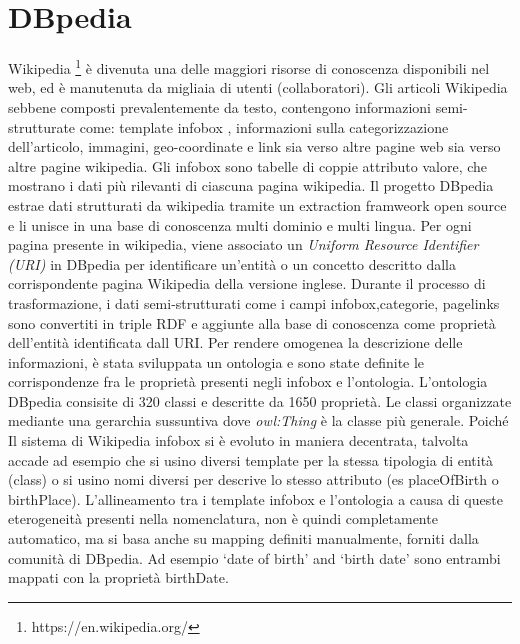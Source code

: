 \section{DBpedia}
Wikipedia \footnote{https://en.wikipedia.org/} è divenuta una delle maggiori risorse di conoscenza disponibili nel web, ed è manutenuta da migliaia di utenti (collaboratori). Gli articoli Wikipedia sebbene composti prevalentemente da testo, contengono informazioni semi-strutturate come: template infobox , informazioni sulla categorizzazione dell'articolo, immagini, geo-coordinate e link sia verso altre pagine web sia verso altre pagine wikipedia.
Gli infobox sono tabelle di coppie attributo valore, che mostrano i dati più rilevanti di ciascuna pagina wikipedia. Il progetto DBpedia \cite{Bizer:2009:DCP:1640541.1640848} estrae dati strutturati da wikipedia tramite un extraction framweork open source e li unisce in una base di conoscenza multi dominio e multi lingua. Per ogni pagina presente in wikipedia, viene associato un \emph{Uniform Resource Identifier (URI)} in DBpedia per identificare un'entità o un concetto descritto dalla corrispondente pagina Wikipedia della versione inglese. Durante il processo di trasformazione, i dati semi-strutturati come i campi infobox,categorie, pagelinks sono convertiti in triple RDF e aggiunte alla base di conoscenza come proprietà dell'entità identificata dall URI.  Per rendere omogenea la descrizione delle informazioni, è stata sviluppata un ontologia e sono state definite le corrispondenze fra le proprietà presenti negli infobox e l'ontologia.
L'ontologia DBpedia consisite di 320 classi e descritte da 1650 proprietà. Le classi organizzate mediante una gerarchia sussuntiva dove \emph{owl:Thing} è la classe più generale. Poiché Il sistema di Wikipedia infobox si è evoluto in maniera decentrata, talvolta accade ad esempio che si usino diversi template per la stessa tipologia di entità (class) o si usino nomi diversi per descrive lo stesso attributo (es placeOfBirth o birthPlace). 
 L'allineamento tra i template infobox e l'ontologia a causa di queste eterogeneità presenti nella nomenclatura, non è quindi completamente automatico, ma si basa anche su mapping definiti manualmente, forniti dalla comunità di DBpedia. Ad esempio ‘date of birth’ and ‘birth
date’ sono entrambi mappati con la proprietà birthDate. 
 
